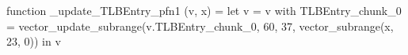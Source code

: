 function _update_TLBEntry_pfn1 (v, x) = let v = { v with TLBEntry_chunk_0 = vector_update_subrange(v.TLBEntry_chunk_0, 60, 37, vector_subrange(x, 23, 0)) } in v
